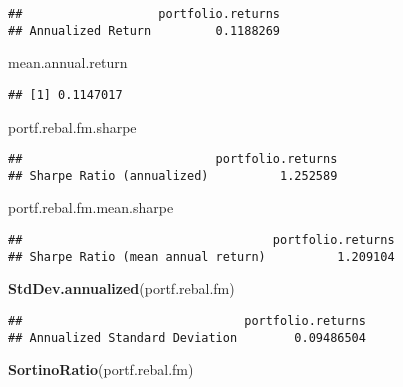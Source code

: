\documentclass[]{article}
\newenvironment{Shaded}{\begin{snugshade}}{\end{snugshade}}
\newcommand{\KeywordTok}[1]{\textcolor[rgb]{0.13,0.29,0.53}{\textbf{#1}}}
\newcommand{\NormalTok}[1]{#1}
\begin{document}
\begin{verbatim}
##                   portfolio.returns
## Annualized Return         0.1188269
\end{verbatim}

\begin{Shaded}
\begin{Highlighting}[]
\NormalTok{mean.annual.return}
\end{Highlighting}
\end{Shaded}

\begin{verbatim}
## [1] 0.1147017
\end{verbatim}

\begin{Shaded}
\begin{Highlighting}[]
\NormalTok{portf.rebal.fm.sharpe}
\end{Highlighting}
\end{Shaded}

\begin{verbatim}
##                           portfolio.returns
## Sharpe Ratio (annualized)          1.252589
\end{verbatim}

\begin{Shaded}
\begin{Highlighting}[]
\NormalTok{portf.rebal.fm.mean.sharpe}
\end{Highlighting}
\end{Shaded}

\begin{verbatim}
##                                   portfolio.returns
## Sharpe Ratio (mean annual return)          1.209104
\end{verbatim}

\begin{Shaded}
\begin{Highlighting}[]
\KeywordTok{StdDev.annualized}\NormalTok{(portf.rebal.fm)}
\end{Highlighting}
\end{Shaded}

\begin{verbatim}
##                               portfolio.returns
## Annualized Standard Deviation        0.09486504
\end{verbatim}

\begin{Shaded}
\begin{Highlighting}[]
\KeywordTok{SortinoRatio}\NormalTok{(portf.rebal.fm)}
\end{Highlighting}
\end{Shaded}
\end{document}
